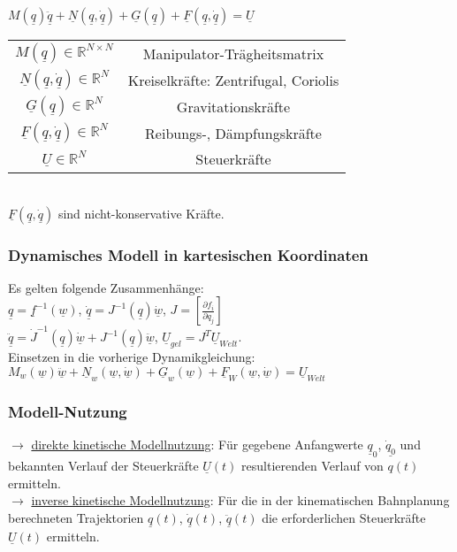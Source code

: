 \documentclass[a4paper,landscape,6pt]{article}
\newcommand{\ul}[1]{\underline{#1}}
\begin{document}
\begin{multicols}{3}
 $\boxed{M(\ul q)\ul{\ddot q} + \ul N (\ul q, \ul{\dot q}) + \ul G (\ul q) + \ul F(\ul q, \ul{\dot q}) = \ul U}$\\
 
 \begin{tabular}{|c|c|}
 	\hline
 $M(\ul q) \in \mathbb{R}^{N \times N}$ & Manipulator-Trägheitsmatrix \\
 	$\ul N (\ul q, \ul{\dot q}) \in \mathbb{R}^N $ & Kreiselkräfte: Zentrifugal, Coriolis\\
 	$\ul G (\ul q) \in \mathbb{R}^N$ & Gravitationskräfte \\
 	$\ul F(\ul q, \ul{\dot q}) \in \mathbb{R}^N$& Reibungs-, Dämpfungskräfte \\
 	$\ul U \in \mathbb{R}^N$& Steuerkräfte \\
 	\hline
 \end{tabular}\\

$\ul F(\ul q, \ul{\dot q})$ sind nicht-konservative Kräfte.
\newpage
\subsubsection*{Dynamisches Modell in kartesischen Koordinaten}
Es gelten folgende Zusammenhänge:\\
$\ul q = \ul f^{-1}(\ul w)$, \tab $\ul{\dot q} = J^{-1}(\ul q) \ul{\dot w}$, \tab $J=\left[\frac{\partial f_i}{\partial q_j}\right]$ \\ $\ul{\ddot q} = \dot J^{-1}(\ul q) \ul{\dot w} + J^{-1}(\ul q) \ul{\ddot w}$, \tab  $\ul U_{gel} = J^T \ul U_{Welt}$.\\
Einsetzen in die vorherige Dynamikgleichung:\\

$\boxed{M_w(\ul w)\ul{\ddot w} + \ul N_w (\ul w, \ul{\dot w}) + \ul G_w (\ul w) + \ul F_W(\ul w, \ul{\dot w}) = \ul U_{Welt}}$
\subsubsection*{Modell-Nutzung}
$\rightarrow$ \ul{direkte kinetische Modellnutzung}: Für gegebene Anfangwerte $\ul q_0$, $\ul{\dot q_0}$ und bekannten Verlauf der Steuerkräfte $\ul U (t)$ resultierenden Verlauf von $q(t)$ ermitteln.\\

$\rightarrow$ \ul{inverse kinetische Modellnutzung}: Für die in der kinematischen Bahnplanung berechneten Trajektorien $\ul q(t)$, $\ul{\dot q}(t)$, $\ul{\ddot q}(t)$ die erforderlichen Steuerkräfte $\ul U(t)$ ermitteln.

\end{multicols}
\end{document}
